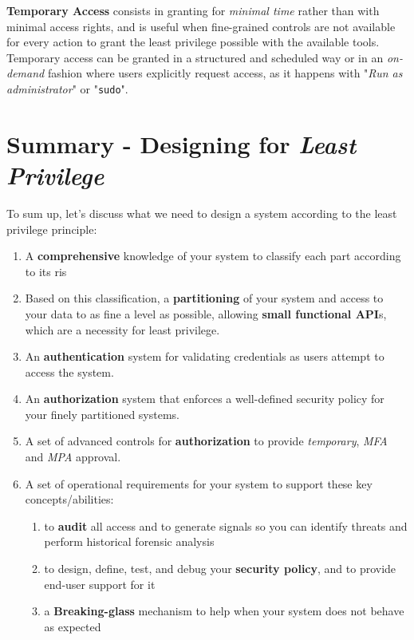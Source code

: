 \textbf{Temporary Access} consists in granting for \textit{minimal time}
rather than with minimal access rights,
and is useful when fine-grained controls are not available for every action to grant
the least privilege possible with the available tools.
Temporary access can be granted in a structured and scheduled way or in an
\textit{on-demand} fashion where users explicitly request access,
as it happens with "\textit{Run as administrator}" or "\texttt{sudo}".

\section{Summary - Designing for \textit{Least Privilege}}
To sum up, let's discuss what we need to design a system according to the least privilege principle:
\begin{enumerate}
   \item A \textbf{comprehensive} knowledge of your system to classify each part according to its ris
   \item Based on this classification, a \textbf{partitioning} of your system and access to your data to as fine a level as possible,
   allowing \textbf{small functional API}s,
   which are a necessity for least privilege.
   \item An \textbf{authentication} system for validating credentials as users attempt to access the system.
   \item An \textbf{authorization} system that enforces a well-defined security policy for your finely
   partitioned systems.
   \item A set of advanced controls for \textbf{authorization} to provide \textit{temporary}, \textit{MFA} and \textit{MPA} approval.
   \item A set of operational requirements for your system to support these key concepts/abilities:
   \begin{enumerate}
      \item to \textbf{audit} all access and to generate signals so you can identify threats and perform
      historical forensic analysis
      \item to design, define, test, and debug your \textbf{security policy}, and to provide end-user
      support for it
      \item a \textbf{Breaking-glass} mechanism to help when your system does not behave as expected
   \end{enumerate}
\end{enumerate}

